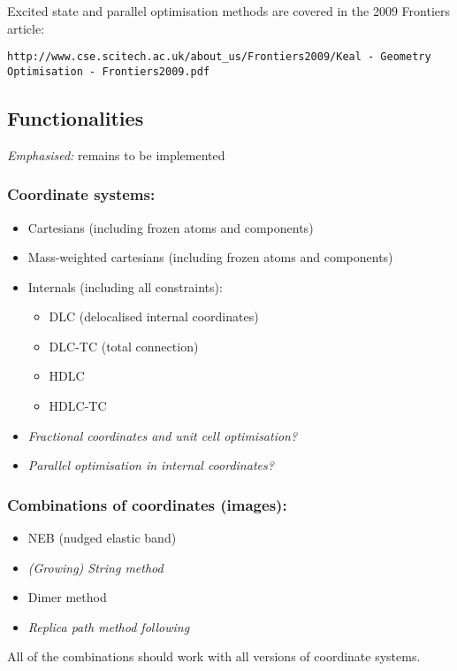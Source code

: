 \documentclass{article}
\begin{document}
Excited state and parallel optimisation methods are covered in the 2009 Frontiers article: 

\texttt{http://www.cse.scitech.ac.uk/about\_us/Frontiers2009/Keal - Geometry Optimisation - Frontiers2009.pdf}

\subsection{Functionalities}

\emph{Emphasised:} remains to be implemented

\subsubsection{Coordinate systems:}
\begin{itemize}
\item Cartesians (including frozen atoms and components)
\item Mass-weighted cartesians (including frozen atoms and components)
\item Internals (including all constraints): 
  \begin{itemize}
  \item DLC (delocalised internal coordinates)
  \item DLC-TC (total connection)
  \item HDLC
  \item HDLC-TC
  \end{itemize}
\item \emph{Fractional coordinates and unit cell optimisation?}
\item \emph{Parallel optimisation in internal coordinates?}
\end{itemize}

\subsubsection{Combinations of coordinates (images):}
\begin{itemize}
\item NEB (nudged elastic band)
\item \emph{(Growing) String method}
\item Dimer method \cite{hen99,hey05,kae08}
\item \emph{Replica path method following \cite{woo03}}
\end{itemize}
All of the combinations should work with all versions of coordinate systems.
\end{document}

